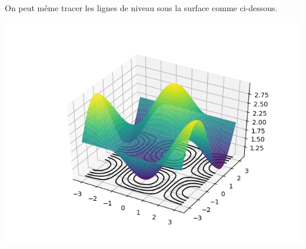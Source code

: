 \documentclass[11pt,class=report,crop=false]{standalone}
\begin{document}
On peut même tracer les lignes de niveau sous la surface comme ci-dessous.
\begin{center}
\includegraphics[scale=\myscale,scale=0.9]{figures/pythonxy-niveau-3d-4}
\end{center}
\end{document}
